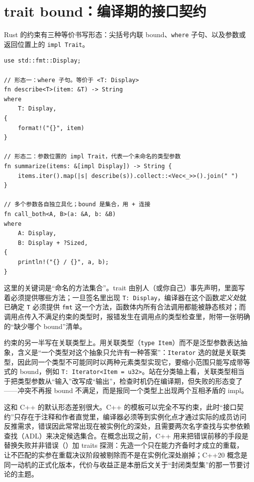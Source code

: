\documentclass[12pt,a4paper,fontset=fandol]{ctexbook}
\newcommand{\cpp}[1]{C++#1}
\newcommand{\kw}[1]{\texttt{#1}}
\newcommand{\seqkw}[1]{\seqsplit{\texttt{#1}}}
\begin{document}
\section{trait bound：编译期的接口契约}

Rust 的约束有三种等价书写形态：尖括号内联 bound、\kw{where} 子句、以及参数或返回位置上的 \kw{impl Trait}。

\begin{lstlisting}[style=ruststyle,caption={三种约束写法：内联 bound、where 子句、参数位置的 impl Trait}]
use std::fmt::Display;

// 形态一：where 子句。等价于 <T: Display>
fn describe<T>(item: &T) -> String
where
    T: Display,
{
    format!("{}", item)
}

// 形态二：参数位置的 impl Trait，代表一个未命名的类型参数
fn summarize(items: &[impl Display]) -> String {
    items.iter().map(|s| describe(s)).collect::<Vec<_>>().join(" ")
}

// 多个参数各自独立具化；bound 是集合，用 + 连接
fn call_both<A, B>(a: &A, b: &B)
where
    A: Display,
    B: Display + ?Sized,
{
    println!("{} / {}", a, b);
}
\end{lstlisting}

这里的关键词是“命名的方法集合”。trait 由别人（或你自己）事先声明，里面写着必须提供哪些方法；一旦签名里出现 \kw{T: Display}，编译器在这个函数\emph{定义处}就已确定 \kw{T} 必须提供 \kw{fmt} 这一个方法，函数体内所有合法调用都能被静态核对；而调用点传入不满足约束的类型时，报错发生在调用点的类型检查里，附带一张明确的“缺少哪个 bound”清单。

约束的另一半写在关联类型上。用关联类型（\kw{type Item}）而不是泛型参数表达抽象，含义是“一个类型对这个抽象只允许有一种答案”：\kw{Iterator} 选的就是关联类型，因此同一个类型不可能同时以两种元素类型实现它，要缩小范围只能写成带等式的 bound，例如 \kw{T: Iterator<Item = u32>}。站在分类轴上看，关联类型相当于把类型参数从“输入”改写成“输出”，检查时机仍在编译期，但失败的形态变了——冲突不再报 bound 不满足，而是报同一个类型上出现两个互相矛盾的 impl。

这和 \cpp{} 的默认形态差别很大。\cpp{} 的模板可以完全不写约束，此时“接口契约”只存在于注释和作者直觉里，编译器必须等到实例化点才通过实际的成员访问反推需求，错误因此常常出现在被实例化的深处，且需要两次名字查找与实参依赖查找（ADL）来决定候选集合。在概念出现之前，\cpp{} 用来把错误前移的手段是替换失败并非错误（\seqkw{SFINAE}）加 traits 探测：先造一个只在能力齐备时才成立的重载，让不匹配的实参在重载决议阶段被剔除而不是在实例化深处崩掉；\cpp{20} 概念是同一动机的正式化版本，代价与收益正是本册后文关于“封闭类型集”的那一节要讨论的主题。
\end{document}
